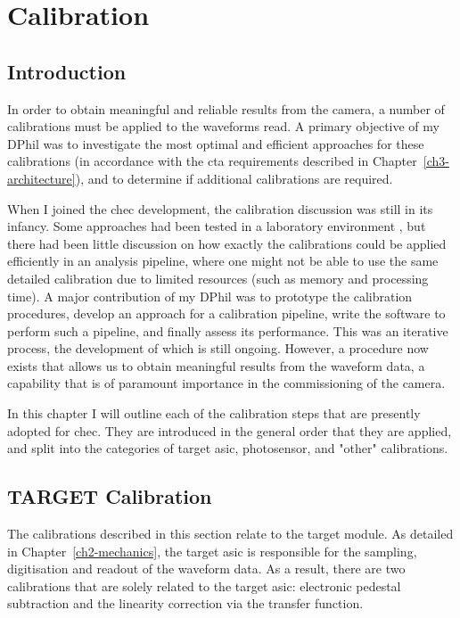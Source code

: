  \chapter{\label{ch5-calibration}Calibration} 

\minitoc

\lstset{language=Python}

\section{Introduction}

In order to obtain meaningful and reliable results from the camera, a number of calibrations must be applied to the waveforms read. A primary objective of my DPhil was to investigate the most optimal and efficient approaches for these calibrations (in accordance with the \gls{cta} requirements described in Chapter~\ref{ch3-architecture}), and to determine if additional calibrations are required.

When I joined the \gls{chec} development, the calibration discussion was still in its infancy. Some approaches had been tested in a laboratory environment \cite{Bechtol2012}, but there had been little discussion on how exactly the calibrations could be applied efficiently in an analysis pipeline, where one might not be able to use the same detailed calibration due to limited resources (such as memory and processing time). A major contribution of my DPhil was to prototype the calibration procedures, develop an approach for a calibration pipeline, write the software to perform such a pipeline, and finally assess its performance. This was an iterative process, the development of which is still ongoing. However, a procedure now exists that allows us to obtain meaningful results from the waveform data, a capability that is of paramount importance in the commissioning of the camera.

In this chapter I will outline each of the calibration steps that are presently adopted for \gls{chec}. They are introduced in the general order that they are applied, and split into the categories of \gls{target} \gls{asic}, photosensor, and "other" calibrations.

\section{TARGET Calibration}

The calibrations described in this section relate to the \gls{target} module. As detailed in Chapter~\ref{ch2-mechanics}, the \gls{target} \gls{asic} is responsible for the sampling, digitisation and readout of the waveform data. As a result, there are two calibrations that are solely related to the \gls{target} \gls{asic}: electronic pedestal subtraction and the linearity correction via the transfer function. 

